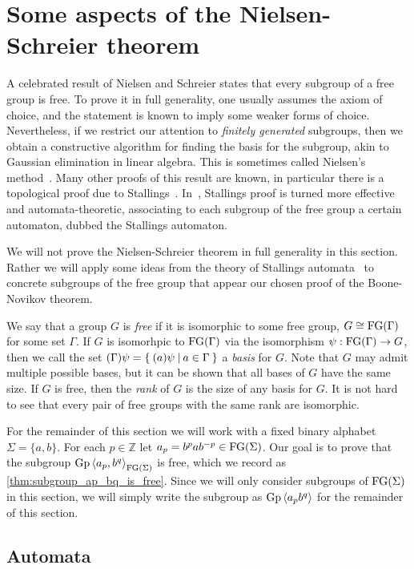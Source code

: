 \chapter{Some aspects of the Nielsen-Schreier theorem}

A celebrated result of Nielsen and Schreier states that every subgroup of a free group is free.
To prove it in full generality, one usually assumes the axiom of choice, and the statement is
known to imply some weaker forms of choice. Nevertheless, if we restrict our attention to
\emph{finitely generated} subgroups, then we obtain a constructive algorithm for finding the
basis for the subgroup, akin to Gaussian elimination in linear algebra. This is sometimes called
Nielsen's method~\cite{Lyndon2001aa}. Many other proofs of this result are known, in particular
there is a topological proof due to Stallings~\cite{Stallings1983aa}. In~\cite{Kapovich2002aa},
Stallings proof is turned more effective and automata-theoretic, associating to each subgroup
of the free group a certain automaton, dubbed the Stallings automaton.

We will not prove the Nielsen-Schreier theorem in full generality in this section.
Rather we will apply some ideas from the theory of Stallings automata~\cite{Kapovich2002aa} to concrete subgroups of the
free group that appear our chosen proof of the Boone-Novikov theorem.

We say that a group $G$ is \emph{free} if it is isomorphic to some free group, $G\cong \textrm{FG}(\Gamma)$ for some
set $\Gamma$. If $G$ is isomorhpic to $\textrm{FG}(\Gamma)$ via the isomorphism $\psi: \textrm{FG}(\Gamma) \rightarrow G$, then
we call the set $(\Gamma)\psi = \left\{\: (a)\psi \: \middle|\: a \in \Gamma \:\right\}$ a \emph{basis} for $G$. Note that $G$ may admit multiple
possible bases, but it can be shown that all bases of $G$ have the same size. If $G$ is free, then the \emph{rank}
of $G$ is the size of any basis for $G$. It is not hard to see that every pair of free groups with the same rank are
isomorphic.

For the remainder of this section we will work with a fixed binary alphabet
$\Sigma = \{a, b\}$. For each $p \in \mathbb{Z}$ let $a_p = b^p a b^{-p} \in \textrm{FG}(\Sigma)$. Our
goal is to prove that the subgroup $\textrm{Gp}\left\langle a_p, b^q \right\rangle_{\textrm{FG}(\Sigma)}$ is free,
which we record as \cref{thm:subgroup_ap_bq_is_free}. Since we will only consider subgroups of $\textrm{FG}(\Sigma)$ in this
section, we will simply write the subgroup as $\textrm{Gp}\left\langle a_p b^q \right\rangle$ for the remainder of this section.

\section{Automata}

